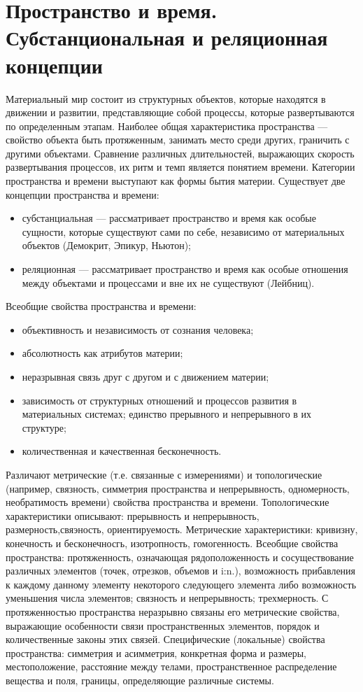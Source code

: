 \documentclass[12pt]{article}
\begin{document}
\newpage
\section{Пространство и время. Субстанциональная и реляционная концепции}
Материальный  мир  состоит  из  структурных  объектов,  которые  находятся  в  движении  и  развитии,
представляющие собой процессы, которые развертываются по определенным этапам.
Наиболее общая характеристика пространства — свойство объекта быть протяженным, занимать место среди
других, граничить с другими объектами.
Сравнение  различных  длительностей,  выражающих  скорость  развертывания  процессов,  их  ритм  и  темп
является понятием времени.
Категории  пространства  и  времени  выступают  как  формы  бытия  материи.  Существует  две  концепции
пространства и времени:
\begin{itemize}
  \item субстанциальная — рассматривает пространство и время как особые сущности, которые существуют сами
по себе, независимо от материальных объектов (Демокрит, Эпикур, Ньютон);
\item реляционная — рассматривает пространство и время как особые отношения между объектами и процессами
и вне их не существуют (Лейбниц).
\end{itemize}
Всеобщие  свойства  пространства  и  времени:
\begin{itemize}
  \item объективность  и  независимость  от  сознания  человека;
  \item абсолютность как атрибутов материи;
  \item неразрывная связь друг с другом и с движением материи;
  \item зависимость от
структурных отношений и процессов развития в материальных системах; единство прерывного и непрерывного
в их структуре;
\item количественная и качественная бесконечность.
\end{itemize}
Различают метрические (т.е. связанные с измерениями) и топологические (например, связность, симметрия
пространства и непрерывность, одномерность, необратимость времени) свойства пространства и времени.
Топологические  характеристики  описывают:  прерывность  и  непрерывность,  размерность,свяэность,
ориентируемость.
Метрические характеристики: кривизну, конечность и бесконечносгь, изотропность, гомогенность.
Всеобщие  свойства  пространства:  протяженность,  означающая  рядоположенность  и  сосуществование
различных элементов (точек, отрезков, объемов и i:n.), возможность прибавления к каждому данному элементу
некоторого следующего элемента либо возможность уменьшения числа элементов; связность и непрерывность;
трехмерность.
С протяженностью пространства неразрывно связаны его метрические свойства, выражающие особенности
связи пространственных элементов, порядок и количественные законы этих связей.
Специфические (локальные) свойства пространства: симметрия и асимметрия, конкретная форма и размеры,
местоположение,  расстояние  между  телами,  пространственное  распределение  вещества  и  поля,  границы,
определяющие различные системы.
\end{document}
